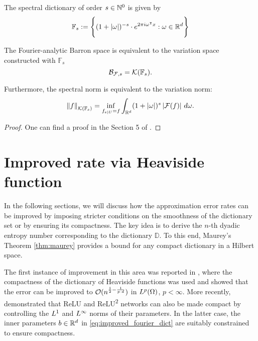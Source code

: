 \begin{definition}
    The spectral dictionary of order $s \in \mathbb{N}^0$ is given by
    \begin{equation}
        \mathbb{F}_s := \Bigg\{ 
            (1 + \left| \omega \right|)^{-s} \cdot e^{2\pi i\omega{}^{\intercal} x}: 
            \omega \in \mathbb{R}^d
        \Bigg\}
    \end{equation}
\end{definition}

\begin{theorem}
The Fourier-analytic Barron space is equivalent to the variation space
constructed with $\mathbb{F}_s$
\begin{equation}
    \mathcal{B}_{\mathcal{F}, s} = \mathcal{K}({\mathbb{F}_s}).
\end{equation}

Furthermore, the spectral norm is equivalent to the variation norm:
\begin{equation}
    \left\| {f} \right\|_{\mathcal{K}({\mathbb{F}_s})} =
    \inf_{f_{e\mid U} = f} \int_{\mathbb{R}^d} 
    (1+\left| \omega \right|)^s \left| \mathcal{F}(f) \right| \,d\omega.
\end{equation}
\end{theorem}

\begin{proof}
    One can find a proof in the Section 5 of
    \cite{siegelCharacterizationVariationSpaces2022}.
\end{proof}

\section{Improved rate via Heaviside function}
\label{sec:improved_heaviside}

In the following sections, we will discuss how the approximation error rates can
be improved by imposing stricter conditions on the smoothness of the dictionary
set or by ensuring its compactness. The key idea is to derive the $n$-th dyadic
entropy number corresponding to the dictionary $\mathbb{D}$. To this end,
Maurey’s Theorem \ref{thm:maurey} provides a bound for any compact dictionary in
a Hilbert space.

The first instance of improvement in this area was reported in
\cite{makovozRandomApproximantsNeural1996}, where the compactness of the
dictionary of Heaviside functions was used and showed that the error can be
improved to $\mathcal{O}(n^{\frac{1}{2} - \frac{1}{p \cdot d}})$ in $L^{p}(\Omega)$,
$p < \infty$. More recently, \cite{klusowskiApproximationCombinationsReLU2018}
demonstrated that ReLU and ReLU\textsuperscript{2} networks can also be made
compact by controlling the $L^{1}$ and $L^{\infty}$ norms of their parameters.
In the latter case, the inner parameters $b\in\mathbb{R}^d$ in
\eqref{eq:improved_fourier_dict} are suitably constrained to ensure compactness.

